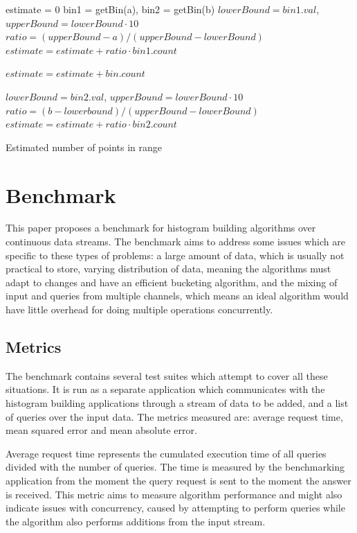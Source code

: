 \documentclass[12pt]{article}
\begin{document}
	\begin{algorithm}[H]
		\label{estimateOSH}

		estimate = 0\;
		bin1 = getBin(a), bin2 = getBin(b)\;
		$lowerBound = bin1.val$, $upperBound = lowerBound \cdot 10$\;
		$ratio = (upperBound - a) / (upperBound - lowerBound)$\;
		$estimate = estimate + ratio \cdot bin1.count$\;

		 {
			$estimate = estimate + bin.count$
		}

		$lowerBound = bin2.val$, $upperBound = lowerBound \cdot 10$\;
		$ratio = (b - lowerbound) / (upperBound - lowerBound)$\;
		$estimate = estimate + ratio \cdot bin2.count$\;

		\caption{Estimated number of points in range}
	\end{algorithm}

	\section{Benchmark}
	This paper proposes a benchmark for histogram building algorithms 
	over continuous data streams. The benchmark aims to address some 
	issues which are specific to these types of problems: a large amount 
	of data, which is usually not practical to store, varying distribution 
	of data, meaning the algorithms must adapt to changes and have an 
	efficient bucketing algorithm, and the mixing of input and queries from 
	multiple channels, which means an ideal algorithm would have little overhead 
	for doing multiple operations concurrently.

	\subsection{Metrics}
	The benchmark contains several test suites which attempt to cover all these 
	situations. It is run as a separate application which communicates with 
	the histogram building applications through a stream of data to be added, 
	and a list of queries over the input data. The metrics measured are: average 
	request time, mean squared error and mean absolute error.

	Average request time represents the cumulated execution time of all queries 
	divided with the number of queries. The time is measured by the benchmarking 
	application from the moment the query request is sent to the moment the answer 
	is received. This metric aims to measure algorithm performance and might 
	also indicate issues with concurrency, caused by attempting to perform 
	queries while the algorithm also performs additions from the input stream.
	
\end{document}
